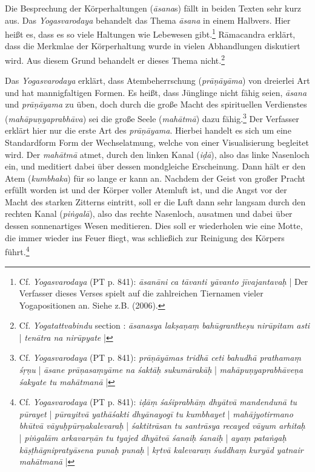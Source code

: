 Die Besprechung der Körperhaltungen (\textit{āsana}s) fällt in beiden Texten sehr kurz aus. Das \emph{Yogasvarodaya} behandelt das Thema \textit{āsana} in einem Halbvers. Hier heißt es, dass es so viele Haltungen wie Lebewesen gibt.\footnote{Cf. \textit{Yogasvarodaya} (PT p. 841): \textit{āsanāni ca tāvanti yāvanto jīvajantavaḥ} | Der Verfasser dieses Verses spielt auf die zahlreichen Tiernamen vieler Yogapositionen an. Siehe z.B. \citeauthor{encyclopediaasana} (2006).} Rāmacandra erklärt, dass die Merkmlae der Körperhaltung wurde in vielen Abhandlungen diskutiert wird. Aus diesem Grund behandelt er dieses Thema nicht.\footnote{Cf. \textit{Yogatattvabindu} section : \textit{āsanasya lakṣaṇaṃ bahūgrantheṣu nirūpitam asti} | \textit{tenātra na nirūpyate} |} 

Das \textit{Yogasvarodaya} erklärt, dass Atembeherrschung (\textit{prāṇāyāma}) von dreierlei Art und hat mannigfaltigen Formen. Es heißt, dass Jünglinge nicht fähig seien, \textit{āsana} und \textit{prāṇāyama} zu üben, doch durch die große Macht des spirituellen Verdienstes (\textit{mahāpuṇyaprabhāva}) sei die große Seele (\textit{mahātmā}) dazu fähig.\footnote{Cf. \textit{Yogasvarodaya} (PT p. 841): \textit{prāṇāyāmas tridhā ceti bahudhā prathamaṃ śṛṇu} | \textit{āsane prāṇasaṃyāme na śaktāḥ sukumārakāḥ} | \textit{mahāpuṇyaprabhāveṇa śakyate tu mahātmanā} |} Der Verfasser erklärt hier nur die erste Art des \textit{prāṇāyama}. Hierbei handelt es sich um eine Standardform Form der Wechselatmung, welche von einer Visualisierung begleitet wird. Der \textit{mahātmā} atmet, durch den linken Kanal (\textit{iḍā}), also das linke Nasenloch ein, und meditiert dabei über dessen mondgleiche Erscheinung. Dann hält er den Atem (\textit{kumbhaka}) für so lange er kann an. Nachdem der Geist von großer Pracht erfüllt worden ist und der Körper voller Atemluft ist, und die Angst vor der Macht des starken Zitterns eintritt, soll er die Luft dann sehr langsam durch den rechten Kanal (\textit{piṅgalā}), also das rechte Nasenloch, ausatmen und dabei über dessen sonnenartiges Wesen meditieren. Dies soll er wiederholen wie eine Motte, die immer wieder ins Feuer fliegt, was schließich zur Reinigung des Körpers führt.\footnote{Cf. \textit{Yogasvarodaya} (PT p. 841): \textit{iḍāṃ śaśiprabhāṃ dhyātvā mandendunā tu pūrayet} | \textit{pūrayitvā yathāśakti dhyānayogī tu kumbhayet} | \textit{mahājyotirmano bhūtvā vāyuḥpūrṇakalevaraḥ} | \textit{śaktitrāsan tu santrāsya recayed vāyum arhitaḥ} | \textit{piṅgalām arkavarṇān tu tyajed dhyātvā śanaiḥ śanaiḥ} | \textit{ayaṃ pataṅgaḥ kāṣṭhāgnipratyāsena punaḥ punaḥ} | \textit{kṛtvā kalevaraṃ śuddhaṃ kuryād yatnair mahātmanā} |} 

